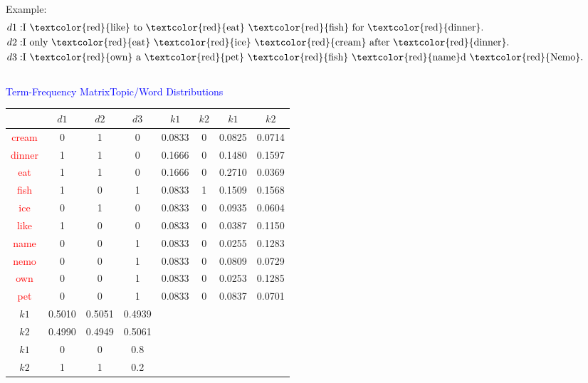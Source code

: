 \documentclass{beamer}
\begin{document}
\begin{frame}
{\begin{columns}
\begin{mdframed}[style=MyFrame]
		Example:
		\vspace{-2mm}
			\begin{align*}
			d1:& \text{I \textcolor{red}{like} to \textcolor{red}{eat} \textcolor{red}{fish} for \textcolor{red}{dinner}.} \\
			d2:& \text{I only \textcolor{red}{eat} \textcolor{red}{ice} \textcolor{red}{cream} after \textcolor{red}{dinner}.} \\
			d3:& \text{I \textcolor{red}{own} a \textcolor{red}{pet} \textcolor{red}{fish} \textcolor{red}{name}d \textcolor{red}{Nemo}.}
			\end{align*}
		\end{mdframed}	
\end{columns}
\vspace{-2mm}
	\begin{center}
		\tiny
		\textcolor{blue}{Term-Frequency Matrix}\hspace{15mm}\textcolor{blue}{Topic/Word Distributions} \\
		\begin{tabular}{ |c||c|c|c|||c|c||c|c|  }
			\hline
			&$d1$&$d2$&$d3$& $k1$& $k2$&$k1$&$k2$ \\
			\hline   
			\textcolor{red}{cream}&0&1&0& 0.0833&0&0.0825 &0.0714 \\
			\textcolor{red}{dinner}&1&1&0& 0.1666&0&0.1480 &0.1597\\
			\textcolor{red}{eat}&1&1&0& 0.1666&0&0.2710 &0.0369\\
			\textcolor{red}{fish}&1&0&1&0.0833&1&0.1509& 0.1568 \\
			\textcolor{red}{ice}&0&1&0&0.0833&0&0.0935 &0.0604 \\
			\textcolor{red}{like}&1&0&0&0.0833&0&0.0387 &0.1150 \\
			\textcolor{red}{name}&0&0&1&0.0833&0&0.0255 &0.1283 \\
			\textcolor{red}{nemo}&0&0&1&0.0833&0& 0.0809& 0.0729 \\
			\textcolor{red}{own}&0&0&1& 0.0833&0& 0.0253& 0.1285 \\
			\textcolor{red}{pet}&0&0&1&0.0833&0&0.0837& 0.0701 \\
			\hline
			$k1$& 0.5010&  0.5051& 0.4939&&&&\\
			$k2$&0.4990& 0.4949& 0.5061&&&&\\
			$k1$&0&0&0.8&&&&\\
			$k2$&1&1&0.2&&&&\\
			\hline
		\end{tabular}
	\end{center}
}
\end{frame}
\end{document}
